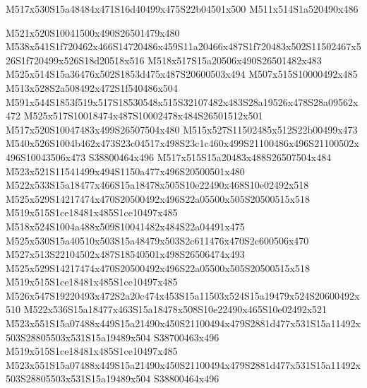 \documentclass{article}
\begin{document}
\begin{multicols}{2}


\begin{center}
M517x530S15a48484x471S16d40499x475S22b04501x500 M511x514S1a520490x486 
\end{center}



M521x520S10041500x490S26501479x480 M538x541S1f720462x466S14720486x459S11a20466x487S1f720483x502S11502467x526S1f720499x526S18d20518x516 M518x517S15a20506x490S26501482x483 M525x514S15a36476x502S1853d475x487S20600503x494 M507x515S10000492x485 M513x528S2a508492x472S1f540486x504 M591x544S1853f519x517S18530548x515S32107482x483S28a19526x478S28a09562x472 M525x517S10018474x487S10002478x484S26501512x501 M517x520S10047483x499S26507504x480 M515x527S11502485x512S22b00499x473 M540x526S1004b462x473S23c04517x498S23c1c460x499S21100486x496S21100502x496S10043506x473 S38800464x496 M517x515S15a20483x488S26507504x484 M523x521S11541499x494S1150a477x496S20500501x480 M522x533S15a18477x466S15a18478x505S10e22490x468S10e02492x518 M525x529S14217474x470S20500492x496S22a05500x505S20500515x518 M519x515S1ce18481x485S1ce10497x485 M518x524S1004a488x509S10041482x484S22a04491x475 M525x530S15a40510x503S15a48479x503S2c611476x470S2c600506x470 M527x513S22104502x487S18540501x498S26506474x493 M525x529S14217474x470S20500492x496S22a05500x505S20500515x518 M519x515S1ce18481x485S1ce10497x485 M526x547S19220493x472S2a20c474x453S15a11503x524S15a19479x524S20600492x510 M522x536S15a18477x463S15a18478x508S10e22490x465S10e02492x521 M523x551S15a07488x449S15a21490x450S21100494x479S2881d477x531S15a11492x503S28805503x531S15a19489x504 S38700463x496 M519x515S1ce18481x485S1ce10497x485 M523x551S15a07488x449S15a21490x450S21100494x479S2881d477x531S15a11492x503S28805503x531S15a19489x504 S38800464x496



\end{multicols}
\end{document}
